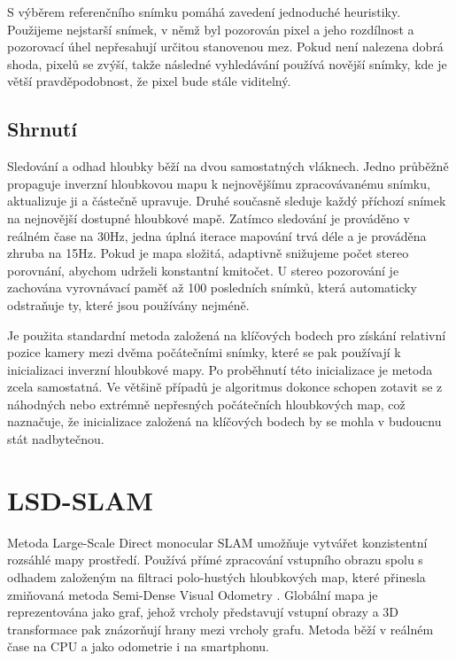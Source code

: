 \documentclass[12pt,a4paper]{report}
\begin{document}
S výběrem referenčního snímku pomáhá zavedení jednoduché heuristiky. Použijeme nejstarší snímek, v němž byl pozorován pixel a jeho rozdílnost a pozorovací úhel nepře\-sahují určitou stanovenou mez. Pokud není nalezena dobrá shoda,  pixelů se zvýší, takže následné vyhledávání používá novější snímky, kde je větší pravděpodobnost, že pixel bude stále viditelný.


\subsection*{Shrnutí}
Sledování a odhad hloubky běží na dvou samostatných vláknech. Jedno průběžně propaguje inverzní hloubkovou mapu k nejnovějšímu zpracovávanému snímku, aktualizuje ji a částečně upravuje. Druhé současně sleduje každý příchozí snímek na nejnovější dostupné hloubkové mapě. Zatímco sledování je prováděno v reálném čase na 30Hz, jedna úplná iterace mapování trvá déle a je prováděna zhruba na 15Hz. Pokud je mapa složitá, adaptivně snižujeme počet stereo porovnání, abychom udrželi konstantní kmitočet. U stereo pozorování je zachována vyrovnávací paměť až 100 posledních snímků, která automaticky odstraňuje ty, které jsou používány nejméně.

Je použita standardní metoda založená na klíčových bodech pro získání relativní pozice kamery mezi dvěma počátečními snímky, které se pak používají k inicializaci inverzní hloubkové mapy. Po proběhnutí této inicializace je metoda zcela samostatná. Ve většině případů je algoritmus dokonce schopen zotavit se z náhodných nebo extrémně nepřesných počátečních hloubkových map, což naznačuje, že inicializace založená na klíčových bodech by se mohla v budoucnu stát nadbytečnou.

\section{LSD-SLAM}
Metoda Large-Scale Direct monocular SLAM umožňuje vytvářet konzistentní rozsáhlé mapy prostředí. Používá přímé zpracování vstupního obrazu spolu s odhadem založeným na filtraci polo-hustých hloubkových map, které přinesla zmiňovaná metoda Semi-Dense Visual Odometry \cite{Semi-Dense_VO}. Globální mapa je reprezentována jako graf, jehož vrcholy představují vstupní obrazy a 3D transformace pak znázorňují hrany mezi vrcholy grafu. Metoda běží v reálném čase na CPU a jako odometrie i na smartphonu.
\end{document}
